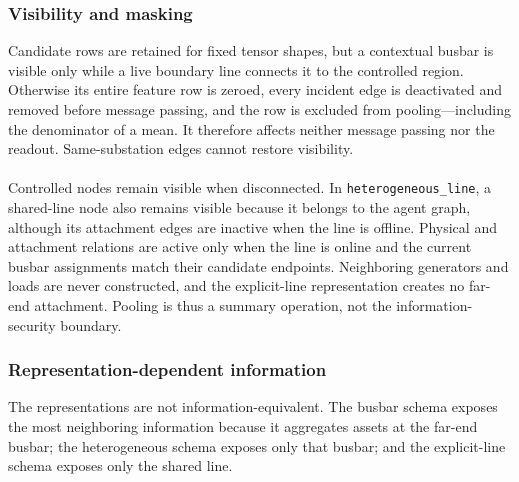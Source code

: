 \subsubsection{Visibility and masking}

Candidate rows are retained for fixed tensor shapes, but a contextual busbar
is visible only while a live boundary line connects it to the controlled
region. Otherwise its entire feature row is zeroed, every incident edge is
deactivated and removed before message passing, and the row is excluded from
pooling---including the denominator of a mean. It therefore affects neither
message passing nor the readout. Same-substation edges cannot restore
visibility.
\\
\\
Controlled nodes remain visible when disconnected. In
\texttt{heterogeneous\_line}, a shared-line node also remains visible because
it belongs to the agent graph, although its attachment edges are inactive when
the line is offline. Physical and attachment relations are active only when
the line is online and the current busbar assignments match their candidate
endpoints. Neighboring generators and loads are never constructed, and the
explicit-line representation creates no far-end attachment. Pooling is thus a
summary operation, not the information-security boundary.



\subsubsection{Representation-dependent information}

The representations are not information-equivalent. The busbar schema exposes
the most neighboring information because it aggregates assets at the far-end
busbar; the heterogeneous schema exposes only that busbar; and the
explicit-line schema exposes only the shared line.


